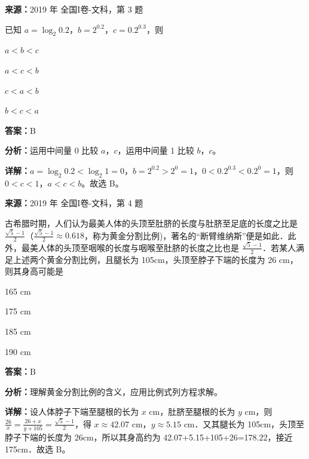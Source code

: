 \begin{question}[points=5]
\textbf{来源：}2019 年 全国I卷-文科，第 3 题\par
已知 $a = \log_2 0.2$，$b = 2^{0.2}$，$c = 0.2^{0.3}$，则
\begin{choices}
  \item $a < b < c$
  \item $a < c < b$
  \item $c < a < b$
  \item $b < c < a$
\end{choices}
\begin{solution}
\textbf{答案：}B

\textbf{分析：}运用中间量 0 比较 $a$，$c$，运用中间量 1 比较 $b$，$c$。

\textbf{详解：}$a = \log_2 0.2 < \log_2 1 = 0$，$b = 2^{0.2} > 2^0 = 1$，$0 < 0.2^{0.3} < 0.2^0 = 1$，则 $0 < c < 1$，$a < c < b$。故选 B。
\end{solution}
\end{question}

\begin{question}[points=5]
\textbf{来源：}2019 年 全国I卷-文科，第 4 题\par
古希腊时期，人们认为最美人体的头顶至肚脐的长度与肚脐至足底的长度之比是 $\frac{\sqrt{5}-1}{2}$（$\frac{\sqrt{5}-1}{2} \approx 0.618$，称为黄金分割比例)，著名的“断臂维纳斯”便是如此．此外，最美人体的头顶至咽喉的长度与咽喉至肚脐的长度之比也是 $\frac{\sqrt{5}-1}{2}$．若某人满足上述两个黄金分割比例，且腿长为 105cm，头顶至脖子下端的长度为 26 cm，则其身高可能是
\begin{choices}
  \item 165 cm
  \item 175 cm
  \item 185 cm
  \item 190 cm
\end{choices}
\begin{solution}
\textbf{答案：}B

\textbf{分析：}理解黄金分割比例的含义，应用比例式列方程求解。

\textbf{详解：}设人体脖子下端至腿根的长为 $x$ cm，肚脐至腿根的长为 $y$ cm，则 $\frac{26}{x} = \frac{26+x}{y+105} = \frac{\sqrt{5}-1}{2}$，得 $x \approx 42.07$ cm，$y \approx 5.15$ cm．又其腿长为 105cm，头顶至脖子下端的长度为 26cm，所以其身高约为 42.07+5.15+105+26=178.22，接近 175cm．故选 B。
\end{solution}
\end{question}

